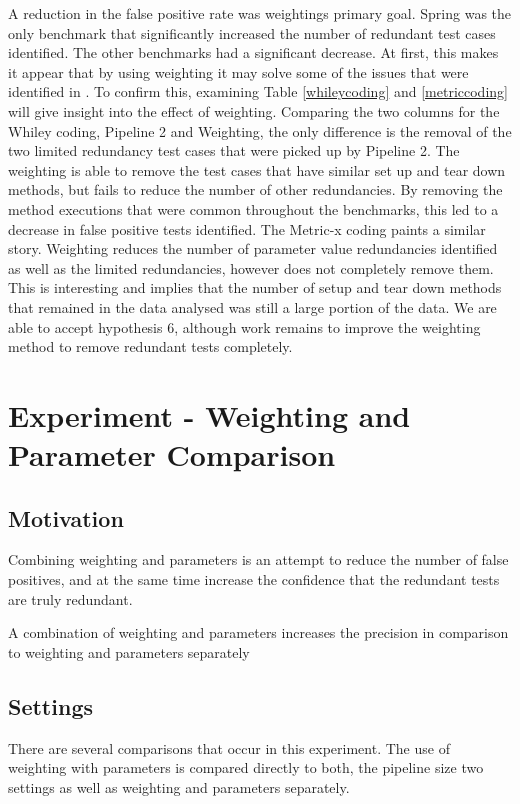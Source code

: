 A reduction in the false positive rate was weightings primary goal. Spring was the only benchmark that significantly increased the number of redundant test cases identified. The other benchmarks had a significant decrease. At first, this makes it appear that by using weighting it may solve some of the issues that were identified in \cite{koochakzadeh2009test} \cite{li2008static}. To confirm this, examining Table \ref{whileycoding} and \ref{metriccoding} will give insight into the effect of weighting. Comparing the two columns for the Whiley coding, Pipeline 2 and Weighting, the only difference is the removal of the two limited redundancy test cases that were picked up by Pipeline 2. The weighting is able to remove the test cases that have similar set up and tear down methods, but fails to reduce the number of other redundancies. By removing the method executions that were common throughout the benchmarks, this led to a decrease in false positive tests identified. The Metric-x coding paints a similar story. Weighting reduces the number of parameter value redundancies identified as well as the limited redundancies, however does not completely remove them. This is interesting and implies that the number of setup and tear down methods that remained in the data analysed was still a large portion of the data. We are able to accept hypothesis 6, although work remains to improve the weighting method to remove redundant tests completely.


\section{Experiment  - Weighting and Parameter Comparison}

\subsection{Motivation}
Combining weighting and parameters is an attempt to reduce the number of false positives, and at the same time increase the confidence that the redundant tests are truly redundant. 

\begin{hyp}
A combination of weighting and parameters increases the precision in comparison to weighting and parameters separately
\end{hyp}

\subsection{Settings}
There are several comparisons that occur in this experiment. The use of weighting with parameters is compared directly to both, the pipeline size two settings as well as weighting and parameters separately.

